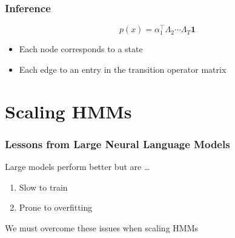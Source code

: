 \documentclass{beamer}
\begin{document}

\begin{frame}
\frametitle{Inference}
$$p(x) = \alpha_1^\top\Lambda_2\cdots\Lambda_T\mathbf{1}$$
\begin{figure}
\begin{center}
\resizebox{0.8\width}{0.8\height}{

}
\end{center}
\end{figure}
\vspace{-1em}
\begin{itemize}
    \item Each node corresponds to a state
    \item Each edge to an entry in the transition operator matrix
\end{itemize}
\end{frame}

\section{Scaling HMMs}

\begin{frame}
\frametitle{Lessons from Large Neural Language Models}

Large models perform better but are \ldots
\vspace{2em}
\begin{enumerate}
\item Slow to train
\vspace{2em}
\item Prone to overfitting
\end{enumerate}
\vspace{2em}
We must overcome these issues when scaling HMMs
\end{frame}
\end{document}

